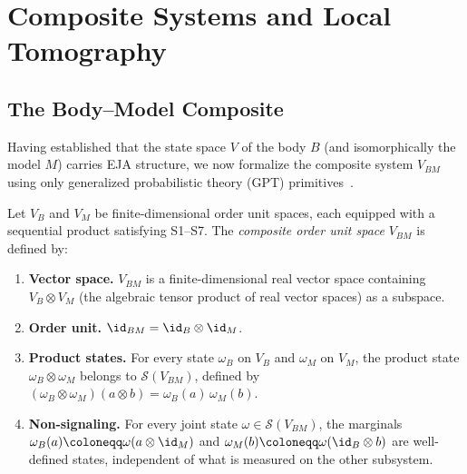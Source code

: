 
\section{Composite Systems and Local Tomography}\label{sec:composite}

\subsection{The Body--Model Composite}\label{subsec:composite-def}

Having established that the state space $V$ of the body $B$ (and
isomorphically the model $M$) carries EJA structure, we now formalize the
composite system $V_{BM}$ using only generalized probabilistic theory
(GPT) primitives~\cite{Plavala2023,Barnum2023}.

\begin{definition}\label{def:composite}
Let $V_B$ and $V_M$ be finite-dimensional order unit spaces, each
equipped with a sequential product satisfying S1--S7. The
\emph{composite order unit space} $V_{BM}$ is defined by:
\begin{enumerate}
\item[\emph{(C1)}] \textbf{Vector space.}
  $V_{BM}$ is a finite-dimensional real vector space containing
  $V_B \otimes V_M$ (the algebraic tensor product of real vector
  spaces) as a subspace.
\item[\emph{(C2)}] \textbf{Order unit.}
  $\id_{BM} = \id_B \otimes \id_M$.
\item[\emph{(C3)}] \textbf{Product states.}
  For every state $\omega_B$ on $V_B$ and $\omega_M$ on $V_M$, the
  product state $\omega_B \otimes \omega_M$ belongs to $\mathcal{S}(V_{BM})$,
  defined by $(\omega_B\otimes\omega_M)(a\otimes b)
  = \omega_B(a)\,\omega_M(b)$.
\item[\emph{(C4)}] \textbf{Non-signaling.}
  For every joint state $\omega \in \mathcal{S}(V_{BM})$, the marginals
  $\omega_B(a) \coloneqq \omega(a\otimes\id_M)$ and
  $\omega_M(b) \coloneqq \omega(\id_B\otimes b)$ are well-defined
  states, independent of what is measured on the other subsystem.
\end{enumerate}
\end{definition}

